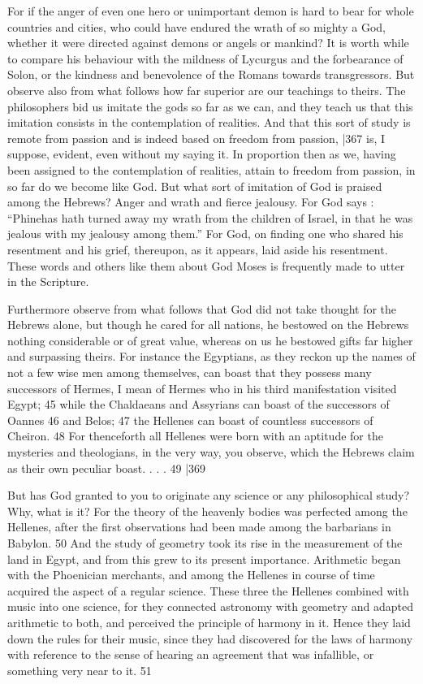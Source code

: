 For if the anger of even one hero or unimportant demon is hard to bear for whole countries and cities, who could have endured the wrath of so mighty a God, whether it were directed against demons or angels or mankind? It is worth while to compare his behaviour with the mildness of Lycurgus and the forbearance of Solon, or the kindness and benevolence of the Romans towards transgressors. But observe also from what follows how far superior are our teachings to theirs. The philosophers bid us imitate the gods so far as we can, and they teach us that this imitation consists in the contemplation of realities. And that this sort of study is remote from passion and is indeed based on freedom from passion,
|367 is, I suppose, evident, even without my saying it. In proportion then as we, having been assigned to the contemplation of realities, attain to freedom from passion, in so far do we become like God. But what sort of imitation of God is praised among the Hebrews? Anger and wrath and fierce jealousy. For God says : ``Phinehas hath turned away my wrath from the children of Israel, in that he was jealous with my jealousy among them.'' For God, on finding one who shared his resentment and his grief, thereupon, as it appears, laid aside his resentment. These words and others like them about God Moses is frequently made to utter in the Scripture.

Furthermore observe from what follows that God did not take thought for the Hebrews alone, but though he cared for all nations, he bestowed on the Hebrews nothing considerable or of great value, whereas on us he bestowed gifts far higher and surpassing theirs. For instance the Egyptians, as they reckon up the names of not a few wise men among themselves, can boast that they possess many successors of Hermes, I mean of Hermes who in his third manifestation visited Egypt;
45 \emph{}while the Chaldaeans and Assyrians can boast of the successors of Oannes
46 and Belos; 47 the Hellenes can boast of countless successors of Cheiron. 48 For thenceforth all Hellenes were born with an aptitude for the mysteries and theologians, in the very way, you observe, which the Hebrews claim as their own peculiar boast. . . . 49
|369

But has God granted to you to originate any science or any philosophical study? Why, what is it? For the theory of the heavenly bodies was perfected among the
Hellenes, after the first observations had been made among the barbarians in Babylon. 50 And the study of geometry took its rise in the measurement of the land in Egypt, and from this grew to its present importance. Arithmetic began with the Phoenician merchants, and among the Hellenes in course of time acquired the aspect of a regular science. These three the Hellenes combined with music into one science, for they connected astronomy with geometry and adapted arithmetic to both, and perceived the principle of harmony in it. Hence they laid down the rules for their music, since they had discovered for the laws of harmony with reference to the sense of hearing an agreement that was infallible, or something very near to it. 51

